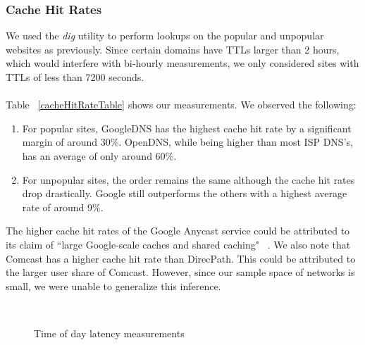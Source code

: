\documentclass[twocolumn]{article}
\begin{document}
\subsubsection{Cache Hit Rates}
We used the \textit{dig} utility to perform lookups on the popular and unpopular websites as previously. Since certain domains have TTLs larger than 2 hours, which would interfere with bi-hourly measurements, we only considered sites with TTLs of less than 7200 seconds.
\\
\\
Table ~\ref{cacheHitRateTable} shows our measurements. We observed the following:
\begin{enumerate}
\item For popular sites, GoogleDNS has the highest cache hit rate by a significant margin of around 30\%. OpenDNS, while being higher than most ISP DNS's, has an average of only around 60\%.
\item For unpopular sites, the order remains the same although the cache hit rates drop drastically. Google still outperforms the others with a highest average rate of around 9\%.
\end{enumerate}
The higher cache hit rates of the Google Anycast service could be attributed to its claim of ``large Google-scale caches and shared caching" ~\cite{website:GoogleDNS:2011:Online}. We also note that Comcast has a higher cache hit rate than DirecPath. This could be attributed to the larger user share of Comcast. However, since our sample space of networks is small, we were unable to generalize this inference.

\begin{figure*}[t!]\footnotesize
\centering
\mbox{
\qquad
{}\qquad
}
\mbox{
}
\caption{Time of day latency measurements}
\label{fig:timeofday}
\end{figure*}
\end{document}
